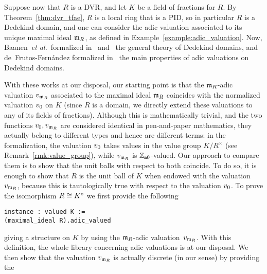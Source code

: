 \documentclass[sigplan,10pt, nonacm, review]{acmart}
\begin{document}
Suppose now that $R$ is a DVR, and let $K$ be a field of fractions for $R$. By Theorem~\ref{thm:dvr_tfae}, $R$ is a local ring that is a PID, so in particular $R$ is a Dedekind domain, and one can consider the adic valuation associated to its unique maximal ideal $\mathfrak{m}_{R}$, as defined in Example~\ref{example:adic_valuation}. Now, Baanen~\emph{et al.}~formalized in~\cite{BaaDahNarNuc21} and~\cite{BaaDahNarNuc22} the general theory of Dedekind domains, and de~Frutos-Fernández formalized in~\cite{deF22} the main properties of adic valuations on Dedekind domains.

With these works at our disposal, our starting point is that the $\mathfrak{m}_{R}$-adic valuation $v_{\mathfrak{m}_{R}}$ associated to the maximal ideal $\mathfrak{m}_{R}$ coincides with the normalized valuation ${v}_{0}$ on $K$ (since $R$ is a domain, we directly extend these valuations to any of its fields of fractions). Although this is mathematically trivial, and the two functions ${v}_{0},v_{\mathfrak{m}_{R}}$ 
are considered identical in pen-and-paper mathematics, they actually belong to different types and hence are different terms: in the \mathlib formalization, the valuation ${v}_{0}$ takes values\href{https://leanprover-community.github.io/mathlib_docs/ring_theory/valuation/valuation_subring.html#valuation_subring.valuation}{\extlink} in the value group $K/R^\times$ (see Remark~\ref{rmk:value_group}), while $v_{\mathfrak{m}_{R}}$ is $\mathbb{Z}_{\mathtt{m}0}$-valued\href{https://leanprover-community.github.io/mathlib_docs/ring_theory/dedekind_domain/adic_valuation.html#is_dedekind_domain.height_one_spectrum.valuation}{\extlink}. Our approach to compare them is to show that the unit balls with respect to both coincide. To do so, it is enough to show that $R$ is the unit ball of $K$ when endowed with the valuation $v_{\mathfrak{m}_{R}}$, because this is tautologically true with respect to the valuation ${v}_{0}$. To prove the isomorphism $R\cong {K}^\circ$ we first provide the following\href{https://github.com/LCFT-Lean/local_fields/blob/76ad487d09babdb0018f394a5634526637ee014a/src/discrete_valuation_ring/basic.lean#L452}{\extlink}
\begin{lstlisting}[caption={The \code{valued} instance on the field of frations of a DVR.}, label={code:valued_DVR}]
instance : valued K :=
(maximal_ideal R).adic_valued
\end{lstlisting}
giving a  structure on $K$ by using the $\mathfrak{m}_{R}$-adic valuation~$v_{\mathfrak{m}_{R}}$. With this definition, the whole library concerning adic valuations is at our disposal. We then show that the valuation $v_{\mathfrak{m}_{R}}$ is actually discrete (in our sense)  by providing the\href{https://github.com/LCFT-Lean/local_fields/blob/76ad487d09babdb0018f394a5634526637ee014a/src/discrete_valuation_ring/basic.lean#L454}{\extlink}
\end{document}
